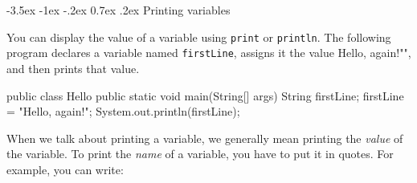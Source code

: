 \documentclass[12pt]{book}
\makeatletter
\theoremstyle{exercise}
\newcommand{\java}[1]{\verb"#1"}
\renewcommand{\section}{\@startsection {section}{1}{\z@}%
    {-3.5ex \@plus -1ex \@minus -.2ex}%
    {0.7ex \@plus.2ex}%
    {\normalfont\Large\bfseries}}
\renewcommand\subsection{\@startsection{subsection}{2}{\z@}%
    {-3.25ex\@plus -1ex \@minus -.2ex}%
    {0.3ex \@plus .2ex}%
    {\normalfont\large\bfseries}}
\newcommand{\java}[1]{\lstinline{#1}} %
\makeatother
\begin{document}
%
%
%
%
%
%


\section{Printing variables}
\label{sec:printvar}

You can display the value of a variable using \java{print} or \java{println}.
The following program declares a variable named \java{firstLine}, assigns it the value \java{"Hello, again!"}, and then prints that value.

\begin{code}
public class Hello {
    public static void main(String[] args) {
        String firstLine;
        firstLine = "Hello, again!";
        System.out.println(firstLine);
    }
}
\end{code}

When we talk about printing a variable, we generally mean printing the {\em value} of the variable.
To print the {\em name} of a variable, you have to put it in quotes.
For example, you can write:
\end{document}
